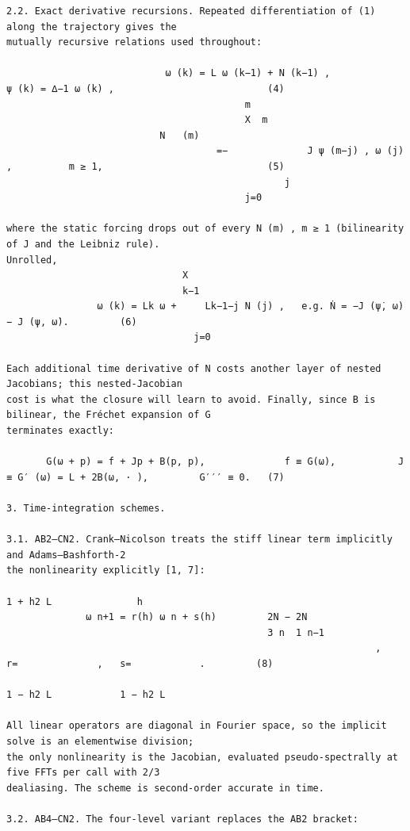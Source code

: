 \documentclass[letterpaper]{article}
\begin{document}
\begin{Verbatim}[fontsize=\fontsize{6.35}{7.15}\selectfont,breaklines=false]
2.2. Exact derivative recursions. Repeated differentiation of (1) along the trajectory gives the
mutually recursive relations used throughout:

                            ω (k) = L ω (k−1) + N (k−1) ,              ψ (k) = ∆−1 ω (k) ,                           (4)
                                          m  
                                          X  m                        
                           N   (m)
                                     =−              J ψ (m−j) , ω (j) ,          m ≥ 1,                             (5)
                                                 j
                                          j=0

where the static forcing drops out of every N (m) , m ≥ 1 (bilinearity of J and the Leibniz rule).
Unrolled,
                               X
                               k−1
                ω (k) = Lk ω +     Lk−1−j N (j) ,   e.g. Ṅ = −J (ψ̇, ω) − J (ψ, ω̇).         (6)
                                 j=0

Each additional time derivative of N costs another layer of nested Jacobians; this nested-Jacobian
cost is what the closure will learn to avoid. Finally, since B is bilinear, the Fréchet expansion of G
terminates exactly:

       G(ω + p) = f + Jp + B(p, p),              f ≡ G(ω),           J ≡ G′ (ω) = L + 2B(ω, · ),         G′′′ ≡ 0.   (7)

3. Time-integration schemes.

3.1. AB2–CN2. Crank–Nicolson treats the stiff linear term implicitly and Adams–Bashforth-2
the nonlinearity explicitly [1, 7]:
                                                                            1 + h2 L               h
              ω n+1 = r(h) ω n + s(h)         2N − 2N
                                              3 n  1 n−1
                                                                 ,       r=              ,   s=            .         (8)
                                                                              1 − h2 L            1 − h2 L

All linear operators are diagonal in Fourier space, so the implicit solve is an elementwise division;
the only nonlinearity is the Jacobian, evaluated pseudo-spectrally at five FFTs per call with 2/3
dealiasing. The scheme is second-order accurate in time.

3.2. AB4–CN2. The four-level variant replaces the AB2 bracket:


\end{Verbatim}
\end{document}
